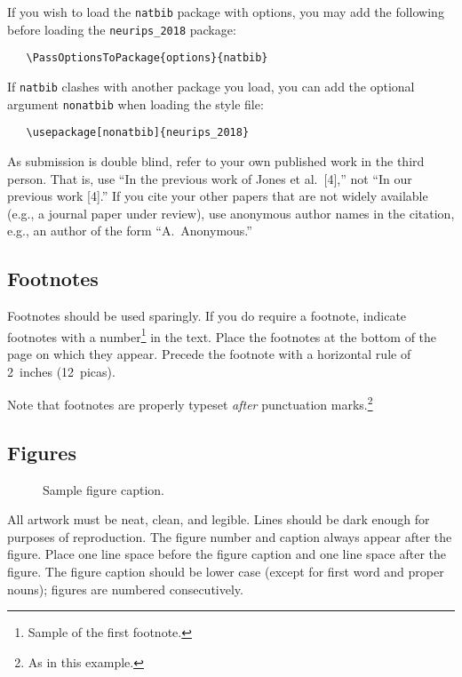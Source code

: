 \documentclass{article}
\begin{document}
If you wish to load the \verb+natbib+ package with options, you may add the
following before loading the \verb+neurips_2018+ package:
\begin{verbatim}
   \PassOptionsToPackage{options}{natbib}
\end{verbatim}

If \verb+natbib+ clashes with another package you load, you can add the optional
argument \verb+nonatbib+ when loading the style file:
\begin{verbatim}
   \usepackage[nonatbib]{neurips_2018}
\end{verbatim}

As submission is double blind, refer to your own published work in the third
person. That is, use ``In the previous work of Jones et al.\ [4],'' not ``In our
previous work [4].'' If you cite your other papers that are not widely available
(e.g., a journal paper under review), use anonymous author names in the
citation, e.g., an author of the form ``A.\ Anonymous.''

\subsection{Footnotes}

Footnotes should be used sparingly.  If you do require a footnote, indicate
footnotes with a number\footnote{Sample of the first footnote.} in the
text. Place the footnotes at the bottom of the page on which they appear.
Precede the footnote with a horizontal rule of 2~inches (12~picas).

Note that footnotes are properly typeset \emph{after} punctuation
marks.\footnote{As in this example.}

\subsection{Figures}

\begin{figure}
  \centering
  \fbox{\rule[-.5cm]{0cm}{4cm} \rule[-.5cm]{4cm}{0cm}}
  \caption{Sample figure caption.}
\end{figure}

All artwork must be neat, clean, and legible. Lines should be dark enough for
purposes of reproduction. The figure number and caption always appear after the
figure. Place one line space before the figure caption and one line space after
the figure. The figure caption should be lower case (except for first word and
proper nouns); figures are numbered consecutively.
\end{document}
